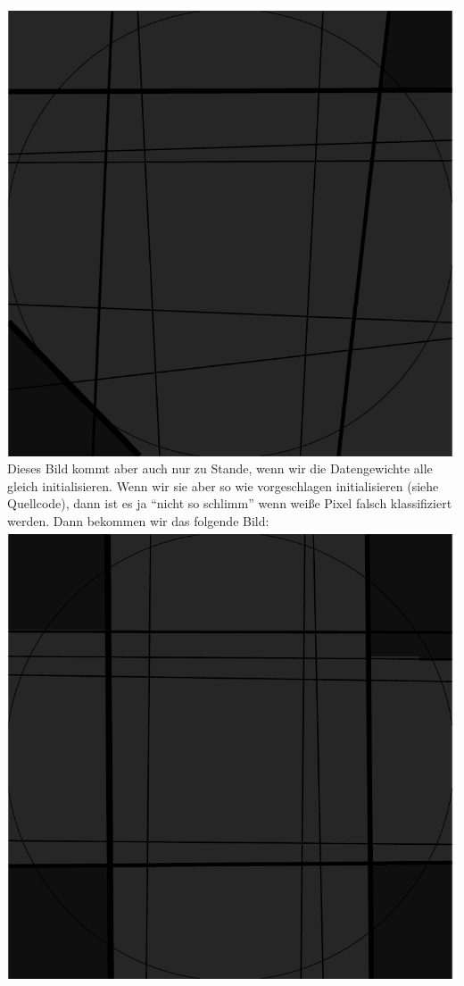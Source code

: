 \documentclass{article}
\begin{document}
\includegraphics[scale=0.75]{big_circle.pdf}\\
Dieses Bild kommt aber auch nur zu Stande, wenn wir die Datengewichte
alle gleich initialisieren. Wenn wir sie aber so wie vorgeschlagen
initialisieren (siehe Quellcode), dann ist es ja ``nicht so schlimm''
wenn weiße Pixel falsch klassifiziert werden. Dann bekommen wir das
folgende Bild:
\includegraphics[scale=0.75]{big_circle2.pdf}\\
\end{document}
